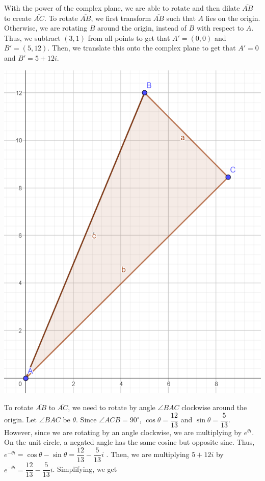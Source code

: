 \documentclass{article}
\begin{document}
With the power of the complex plane, we are able to rotate and then dilate $\overline{AB}$ to create $\overline{AC}$. To rotate $\overline{AB}$, we first transform $\overline{AB}$ such that $A$ lies on the origin. Otherwise, we are rotating $B$ around the origin, instead of $B$ with respect to $A$. Thus, we subtract $(3, 1)$ from all points to get that $A' = (0, 0)$ and $B' = (5, 12)$. Then, we translate this onto the complex plane to get that $A' = 0$ and $B' = 5+12i$. \\ 

\begin{center}
\includegraphics[scale = 0.5]{images/A3_2.png} \\
\end{center}

To rotate $\overline{AB}$ to $\overline{AC}$, we need to rotate by angle $\angle{BAC}$ clockwise around the origin. Let $\angle{BAC}$ be $\theta$. Since $\angle{ACB} = 90^{\circ}$, $\cos{\theta} = \dfrac{12}{13}$ and $\sin{\theta} = \dfrac{5}{13}$. However, since we are rotating by an angle clockwise, we are multiplying by $e^{\theta i}$. On the unit circle, a negated angle has the same cosine but opposite sine. Thus, $e^{-\theta i} = \cos{\theta} - \sin{\theta} = \dfrac{12}{13} - \dfrac{5}{13}i$ . Then, we are multiplying $5 + 12i$ by $e^{-\theta i} = \dfrac{12}{13} - \dfrac{5}{13}i$. Simplifying, we get
\end{document}
